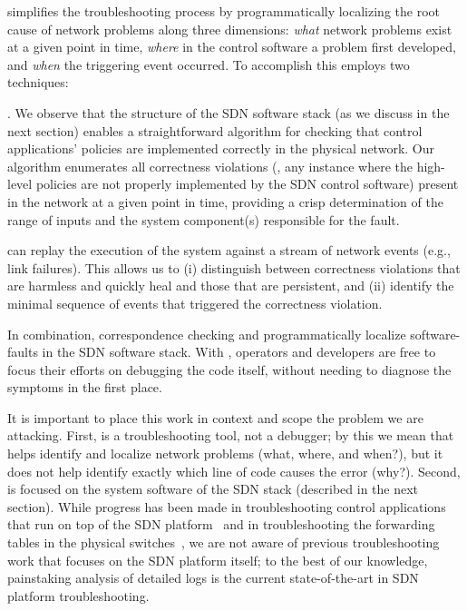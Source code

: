 {\projectname{} simplifies the troubleshooting process by programmatically localizing the root cause
of network problems along three dimensions: {\it what} network problems exist at a
given point in time, {\it where} in the control software a problem first developed, and
{\it when} the triggering event occurred. To accomplish this
\projectname{} employs two techniques:

. We observe that the structure of the
SDN software stack (as we discuss in the next section) enables a straightforward algorithm for
checking that control applications' policies are implemented correctly in
the physical network. Our algorithm enumerates all correctness violations
(\ie{}, any instance where the high-level policies are not properly
implemented by the SDN control software) present in the network at a given point in
time, providing a crisp determination of the range of inputs
and the system component(s) responsible for the fault.

 \projectname{} can replay the execution of the
system against
a stream of network events (e.g., link failures). This allows us to (i)
distinguish between correctness violations that are harmless and quickly heal and
those that are persistent, and (ii) identify the minimal sequence of events that triggered
the correctness violation.


In combination, correspondence checking and \simulator{} programmatically
localize software-faults in the SDN software stack.
With \projectname{}, operators and developers are free to focus their efforts
on debugging the code itself, without needing to
diagnose the symptoms in the first place.

It is important to place this work in context and scope the problem we are
attacking. First, \projectname{} is a troubleshooting tool, not a debugger; by
this we mean that \projectname{} helps identify and localize network
problems (what, where, and when?), but it does not help identify exactly which
line of code causes the error (why?). Second, \projectname{} is focused on the
system software of the SDN stack (described in the next section). While progress has been made in troubleshooting control
applications that run on top of the SDN platform~\cite{nice} and in troubleshooting the forwarding tables in the physical switches~\cite{anteater,hsa}, we
are not aware of previous troubleshooting work that focuses on the SDN
platform itself; to the best of our knowledge, painstaking analysis of detailed logs is the current state-of-the-art in SDN platform troubleshooting.

}
